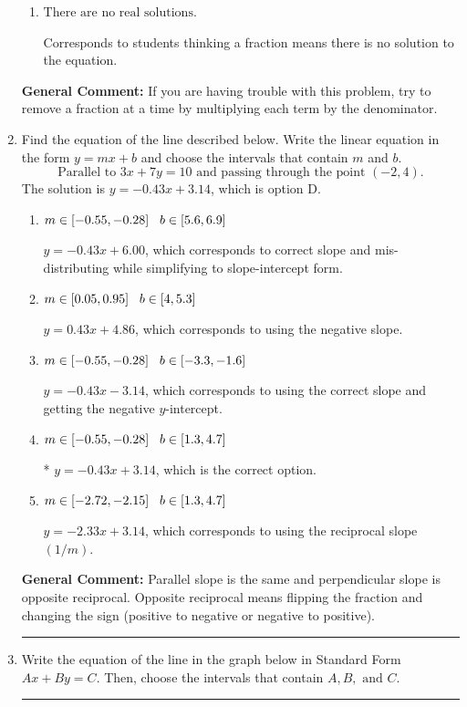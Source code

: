 \documentclass{extbook}[14pt]
\newcommand{\litem}[1]{\item #1

\rule{\textwidth}{0.4pt}}
\begin{document}
\begin{enumerate}
{\begin{enumerate}[label=\Alph*.]
* $x = 7.421$, which is the correct option.
\item \( \text{There are no real solutions.} \)

Corresponds to students thinking a fraction means there is no solution to the equation.
\end{enumerate}

\textbf{General Comment:} If you are having trouble with this problem, try to remove a fraction at a time by multiplying each term by the denominator.
}
\litem{
Find the equation of the line described below. Write the linear equation in the form $ y=mx+b $ and choose the intervals that contain $m$ and $b$.
\[ \text{Parallel to } 3 x + 7 y = 10 \text{ and passing through the point } (-2, 4). \]The solution is \( y = -0.43x + 3.14 \), which is option D.\begin{enumerate}[label=\Alph*.]
\item \( m \in [-0.55, -0.28] \hspace*{3mm} b \in [5.6, 6.9] \)

 $y = -0.43x + 6.00$, which corresponds to correct slope and mis-distributing while simplifying to slope-intercept form.
\item \( m \in [0.05, 0.95] \hspace*{3mm} b \in [4, 5.3] \)

 $y = 0.43x + 4.86$, which corresponds to using the negative slope.
\item \( m \in [-0.55, -0.28] \hspace*{3mm} b \in [-3.3, -1.6] \)

 $y = -0.43x - 3.14$, which corresponds to using the correct slope and getting the negative $y$-intercept.
\item \( m \in [-0.55, -0.28] \hspace*{3mm} b \in [1.3, 4.7] \)

* $y = -0.43x + 3.14$, which is the correct option.
\item \( m \in [-2.72, -2.15] \hspace*{3mm} b \in [1.3, 4.7] \)

 $y = -2.33x + 3.14$, which corresponds to using the reciprocal slope $(1/m)$.
\end{enumerate}

\textbf{General Comment:} Parallel slope is the same and perpendicular slope is opposite reciprocal. Opposite reciprocal means flipping the fraction and changing the sign (positive to negative or negative to positive).
}
\litem{
Write the equation of the line in the graph below in Standard Form $Ax+By=C$. Then, choose the intervals that contain $A, B, \text{ and } C$.

}
\end{enumerate}
\end{document}
